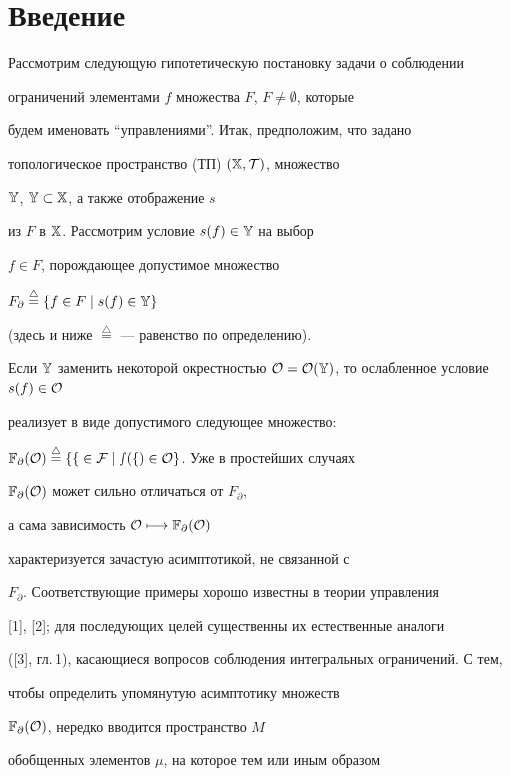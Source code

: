 \section{Введение}





Рассмотрим следующую гипотетическую постановку задачи о соблюдении


ограничений элементами $f$ множества $F$, $F \ne \emptyset$, которые


будем именовать ``управлениями''. Итак, предположим, что задано


топологическое пространство (ТП) $(\Bbb X,\cal T)$, множество


$\Bbb Y$, $\Bbb Y\subset\Bbb X$, а также отображение $s$


из $F$ в $\Bbb X$. Рассмотрим условие $s(f)\in\Bbb Y$ на выбор


$f\in F$, порождающее допустимое множество


$F_\partial\overset{\triangle}{=}\{f \in F\mid s(f)\in\Bbb Y\}$


(здесь и ниже $\overset{\triangle}{=}$ --- равенство по определению).


Если $\Bbb Y$ заменить некоторой окрестностью $\cal O=


\cal O(\Bbb Y)$, то ослабленное условие $s(f)\in\cal O$


реализует в виде допустимого следующее множество:


$\Bbb F_\partial(\cal O)\overset{\triangle}{=}\{f\in F\mid


s(f)\in\cal O\}$. Уже в простейших случаях


$\Bbb F_\partial(\cal O)$ может сильно отличаться от $F_\partial$,


а сама зависимость $\cal O\longmapsto \Bbb F_\partial(\cal O)$


характеризуется зачастую асимптотикой, не связанной с


$F_\partial$. Соответствующие примеры хорошо известны в теории управления


[1], [2]; для последующих целей существенны их естественные аналоги


([3], гл.\,1), касающиеся вопросов соблюдения интегральных ограничений. С тем,


чтобы определить упомянутую асимптотику множеств


$\Bbb F_\partial(\cal O)$, нередко вводится пространство $M$


обобщенных элементов $\mu$, на которое тем или иным образом


